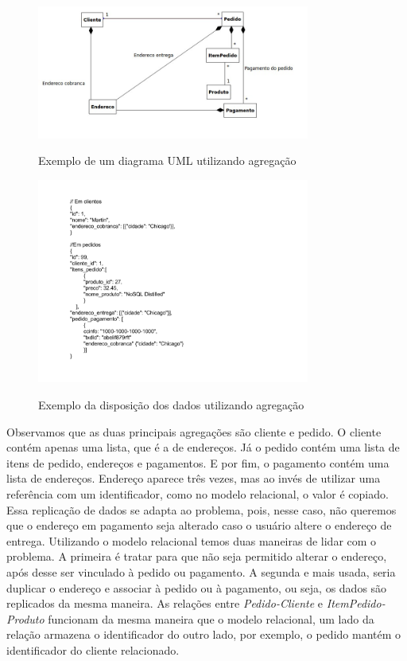 \begin{figure}[H]
    \centering
    \caption{Exemplo de um diagrama \ac{UML} utilizando agregação}
    \includegraphics[width=0.8\textwidth]{./04-figuras/diagrama_no_sql_uml_simples.jpg}
    \label{fig:diagrama_no_sql_uml_simples}
\end{figure}
\begin{figure}[H]
    \centering
    \caption{Exemplo da disposição dos dados utilizando agregação}
    \includegraphics[width=0.8\textwidth]{./04-figuras/disposicao_json_simples.png}
    \label{fig:disposicao_json_simples}
\end{figure}



Observamos que as duas principais agregações são cliente e pedido. O cliente contém apenas uma lista, que é a de endereços. Já o pedido contém uma lista de itens de pedido, endereços e pagamentos. E por fim, o pagamento contém uma lista de endereços. Endereço aparece três vezes, mas ao invés de utilizar uma referência com um identificador, como no modelo relacional, o valor é copiado. Essa replicação de dados se adapta ao problema, pois, nesse caso, não queremos que o endereço em pagamento seja alterado caso o usuário altere o endereço de entrega.  Utilizando o modelo relacional temos duas maneiras de lidar com o problema. A primeira é tratar para que não seja permitido alterar o endereço, após desse ser vinculado à pedido ou pagamento. A segunda e mais usada, seria duplicar o endereço e associar à pedido ou à pagamento, ou seja, os dados são replicados da mesma maneira. As relações entre \textit{Pedido-Cliente} e \textit{ItemPedido-Produto} funcionam da mesma maneira que o modelo relacional, um lado da relação armazena o identificador do outro lado, por exemplo, o pedido mantém o identificador do cliente relacionado.

